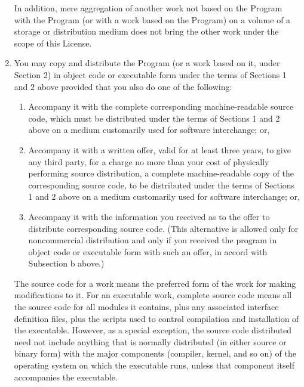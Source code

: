 \documentclass[11pt, letterpaper]{book}
\begin{document}
\begin{enumerate}
In addition, mere aggregation of another work not based on the Program
with the Program (or with a work based on the Program) on a volume of
a storage or distribution medium does not bring the other work under
the scope of this License.

\item
You may copy and distribute the Program (or a work based on it,
under Section 2) in object code or executable form under the terms of
Sections 1 and 2 above provided that you also do one of the following:

\begin{enumerate}

\item

Accompany it with the complete corresponding machine-readable
source code, which must be distributed under the terms of Sections
1 and 2 above on a medium customarily used for software interchange; or,

\item

Accompany it with a written offer, valid for at least three
years, to give any third party, for a charge no more than your
cost of physically performing source distribution, a complete
machine-readable copy of the corresponding source code, to be
distributed under the terms of Sections 1 and 2 above on a medium
customarily used for software interchange; or,

\item

Accompany it with the information you received as to the offer
to distribute corresponding source code.  (This alternative is
allowed only for noncommercial distribution and only if you
received the program in object code or executable form with such
an offer, in accord with Subsection b above.)

\end{enumerate}


The source code for a work means the preferred form of the work for
making modifications to it.  For an executable work, complete source
code means all the source code for all modules it contains, plus any
associated interface definition files, plus the scripts used to
control compilation and installation of the executable.  However, as a
special exception, the source code distributed need not include
anything that is normally distributed (in either source or binary
form) with the major components (compiler, kernel, and so on) of the
operating system on which the executable runs, unless that component
itself accompanies the executable.


\end{enumerate}
\end{document}
